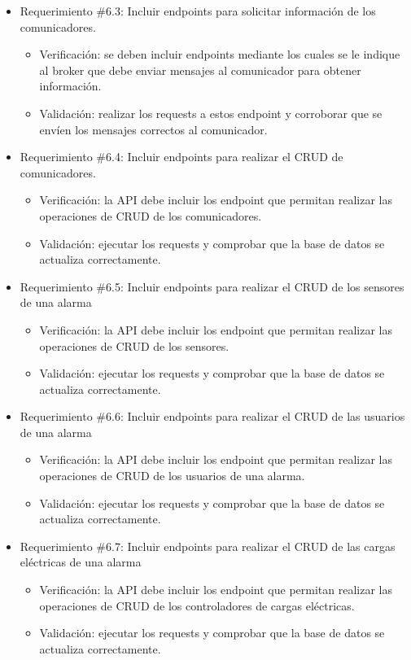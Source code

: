 \documentclass[
11pt, %
]{charter}
\begin{document}
\begin{itemize}
	\item Requerimiento \#6.3: Incluir endpoints para solicitar información de los comunicadores.
	\begin{itemize}
		\item Verificación: se deben incluir endpoints mediante los cuales se le indique al broker que debe enviar mensajes al comunicador para obtener información.
		\item Validación: realizar los requests a estos endpoint y corroborar que se envíen los mensajes correctos al comunicador.
	\end{itemize}
			
	\item Requerimiento \#6.4: Incluir endpoints para realizar el CRUD de comunicadores.
	\begin{itemize}
		\item Verificación: la API debe incluir los endpoint que permitan realizar las operaciones de CRUD de los comunicadores.
		\item Validación: ejecutar los requests y comprobar que la base de datos se actualiza correctamente.
	\end{itemize}
			
	\item Requerimiento \#6.5: Incluir endpoints para realizar el CRUD de los sensores de una alarma
	\begin{itemize}
		\item Verificación: la API debe incluir los endpoint que permitan realizar las operaciones de CRUD de los sensores.
		\item Validación: ejecutar los requests y comprobar que la base de datos se actualiza correctamente.
	\end{itemize}
			
	\item Requerimiento \#6.6: Incluir endpoints para realizar el CRUD de las usuarios de una alarma
	\begin{itemize}
		\item Verificación: la API debe incluir los endpoint que permitan realizar las operaciones de CRUD de los usuarios de una alarma.
		\item Validación: ejecutar los requests y comprobar que la base de datos se actualiza correctamente.
	\end{itemize}
			
	\item Requerimiento \#6.7: Incluir endpoints para realizar el CRUD de las cargas eléctricas de una alarma
	\begin{itemize}
		\item Verificación: la API debe incluir los endpoint que permitan realizar las operaciones de CRUD de los controladores de cargas eléctricas.
		\item Validación: ejecutar los requests y comprobar que la base de datos se actualiza correctamente.
	\end{itemize}
			

\end{itemize}
\end{document}
